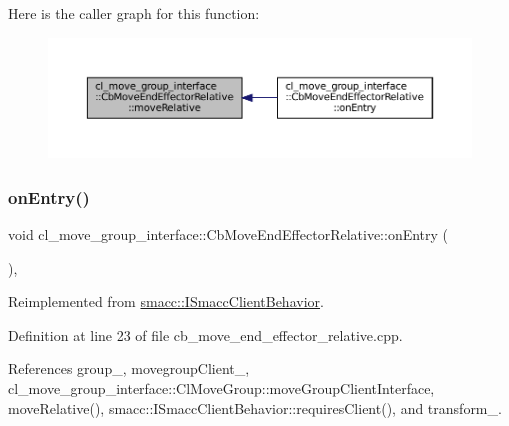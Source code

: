 Here is the caller graph for this function\+:
\nopagebreak
\begin{figure}[H]
\begin{center}
\leavevmode
\includegraphics[width=350pt]{classcl__move__group__interface_1_1CbMoveEndEffectorRelative_ab9498fefa83f46b974ce5b13df7dbd16_icgraph}
\end{center}
\end{figure}
\mbox{\label{classcl__move__group__interface_1_1CbMoveEndEffectorRelative_a805a9d0f85ecdb1f503c1d6349ed9036}} 
\subsubsection{\texorpdfstring{on\+Entry()}{onEntry()}}
{\footnotesize\ttfamily void cl\+\_\+move\+\_\+group\+\_\+interface\+::\+Cb\+Move\+End\+Effector\+Relative\+::on\+Entry (\begin{DoxyParamCaption}{ }\end{DoxyParamCaption})\hspace{0.3cm}{\ttfamily [override]}, {\ttfamily [virtual]}}



Reimplemented from \hyperlink{classsmacc_1_1ISmaccClientBehavior_a9877684b1954429719826e2d0924d980}{smacc\+::\+I\+Smacc\+Client\+Behavior}.



Definition at line 23 of file cb\+\_\+move\+\_\+end\+\_\+effector\+\_\+relative.\+cpp.



References group\+\_\+, movegroup\+Client\+\_\+, cl\+\_\+move\+\_\+group\+\_\+interface\+::\+Cl\+Move\+Group\+::move\+Group\+Client\+Interface, move\+Relative(), smacc\+::\+I\+Smacc\+Client\+Behavior\+::requires\+Client(), and transform\+\_\+.


